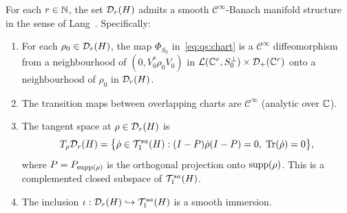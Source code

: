 \begin{theorem}
\label{thm:qs:manifold}
For each $r \in \mathbb{N}$, the set $\mathcal{D}_{r}(H)$ admits a smooth
$\mathcal{C}^\infty$-Banach manifold structure in the sense of
Lang~\cite{Lang1999}. Specifically:
\begin{enumerate}
\item[\textup{(i)}] For each $\rho_0 \in \mathcal{D}_{r}(H)$, the map
    $\Phi_{S_0}$ in~\eqref{eq:qs:chart} is a $\mathcal{C}^\infty$
    diffeomorphism from a neighbourhood of $(0, V_0^*\rho_0 V_0)$ in
    $\mathcal{L}(\mathbb{C}^r, S_0^\perp) \times \mathcal{D}_+(\mathbb{C}^r)$ onto a neighbourhood
    of $\rho_0$ in $\mathcal{D}_{r}(H)$.
\item[\textup{(ii)}] The transition maps between overlapping charts are
    $\mathcal{C}^\infty$ (analytic over $\mathbb{C}$).
\item[\textup{(iii)}] The tangent space at $\rho \in \mathcal{D}_{r}(H)$ is
    \begin{equation}
    \label{eq:qs:tangent}
        T_\rho \mathcal{D}_{r}(H)
        = \bigl\{ \dot\rho \in \mathcal{T}_{1}^{sa}(H) :
        (I - P)\dot\rho(I - P) = 0,\;
        \mathrm{Tr}(\dot\rho) = 0 \bigr\},
    \end{equation}
    where $P = P_{\mathrm{supp}(\rho)}$ is the orthogonal projection onto
    $\mathrm{supp}(\rho)$. This is a complemented closed subspace of
    $\mathcal{T}_{1}^{sa}(H)$.
\item[\textup{(iv)}] The inclusion $\iota: \mathcal{D}_{r}(H) \hookrightarrow
    \mathcal{T}_{1}^{sa}(H)$ is a smooth immersion.
\end{enumerate}
\end{theorem}

